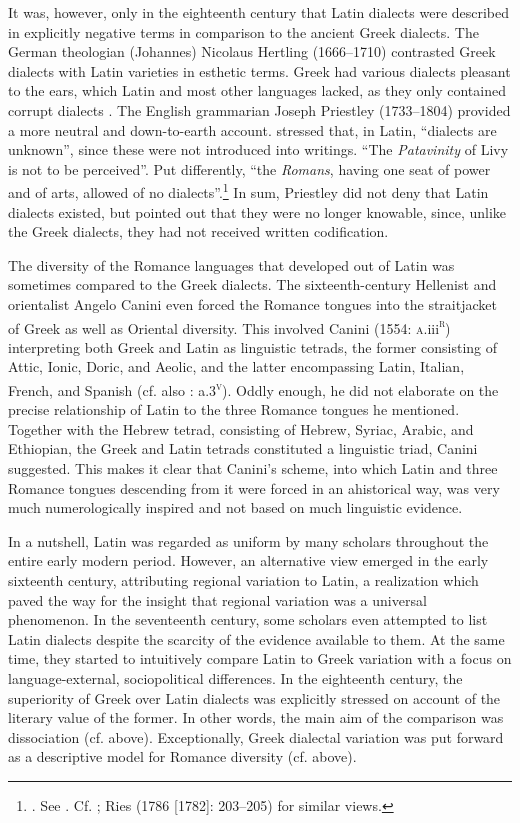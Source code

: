 \documentclass[output=paper]{langsci/langscibook}
\begin{document}
It was, however, only in the eighteenth century that Latin dialects were described in explicitly negative terms in comparison to the ancient Greek dialects. The German theologian (Johannes) Nicolaus Hertling (1666–1710) contrasted Greek dialects with Latin varieties in esthetic terms. Greek had various dialects pleasant to the ears, which Latin and most other languages lacked, as they only contained corrupt dialects \citep[73]{Hertling1708}. The English grammarian Joseph Priestley (1733–1804) provided a more neutral and down-to-earth account. \citet[138]{Priestley1762} stressed that, in Latin, “dialects are unknown”, since these were not introduced into writings. “The \textit{Patavinity} of Livy is not to be perceived”. Put differently, “the \textit{Romans}, having one seat of power and of arts, allowed of no dialects”.\footnote{\citet[280]{Priestley1762}. See \citet[52]{Amsler1993}. Cf. \citet[49]{Galiani1779}; Ries (1786 [1782]: 203–205) for similar views.} In sum, Priestley did not deny that Latin dialects existed, but pointed out that they were no longer knowable, since, unlike the Greek dialects, they had not received written codification.

The diversity of the Romance languages that developed out of Latin was sometimes compared to the Greek dialects. The sixteenth-century Hellenist and orientalist Angelo Canini even forced the Romance tongues into the straitjacket of Greek as well as Oriental diversity. This involved Canini (1554: \textsc{a}.iii\textsc{\textsuperscript{r}}) interpreting both Greek and Latin as linguistic tetrads, the former consisting of Attic, Ionic, Doric, and Aeolic, and the latter encompassing Latin, Italian, French, and Spanish (cf. also \citealt{Canini1555}: a.3\textsc{\textsuperscript{v}}). Oddly enough, he did not elaborate on the precise relationship of Latin to the three Romance tongues he mentioned. Together with the Hebrew tetrad, consisting of Hebrew, Syriac, Arabic, and Ethiopian, the Greek and Latin tetrads constituted a linguistic triad, Canini suggested. This makes it clear that Canini’s scheme, into which Latin and three Romance tongues descending from it were forced in an ahistorical way, was very much numerologically inspired and not based on much linguistic evidence.

In a nutshell, Latin was regarded as uniform by many scholars throughout the entire early modern period. However, an alternative view emerged in the early sixteenth century, attributing regional variation to Latin, a realization which paved the way for the insight that regional variation was a universal phenomenon. In the seventeenth century, some scholars even attempted to list Latin dialects despite the scarcity of the evidence available to them. At the same time, they started to intuitively compare Latin to Greek variation with a focus on language-external, sociopolitical differences. In the eighteenth century, the superiority of Greek over Latin dialects was explicitly stressed on account of the literary value of the former. In other words, the main aim of the comparison was dissociation (cf.  above). Exceptionally, Greek dialectal variation was put forward as a descriptive model for Romance diversity (cf.  above).
\end{document}
